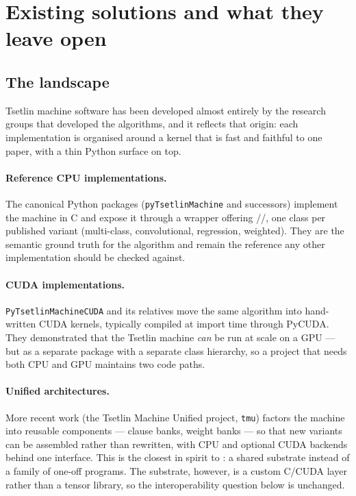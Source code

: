 \section{Existing solutions and what they leave open}
\label{sec:existing}

\subsection{The landscape}

Tsetlin machine software has been developed almost entirely by the research groups that
developed the algorithms, and it reflects that origin: each implementation is organised
around a kernel that is fast and faithful to one paper, with a thin Python surface on top.

\paragraph{Reference CPU implementations.}
The canonical Python packages (\texttt{pyTsetlinMachine} and successors) implement the
machine in C and expose it through a wrapper offering
\slash{}\slash{}, one class per published variant
(multi-class, convolutional, regression, weighted). They are the semantic ground truth for
the algorithm and remain the reference any other implementation should be checked against.

\paragraph{CUDA implementations.}
\texttt{PyTsetlinMachineCUDA} and its relatives move the same algorithm into hand-written
CUDA kernels, typically compiled at import time through PyCUDA. They demonstrated that the
Tsetlin machine \emph{can} be run at scale on a GPU --- but as a separate package with a
separate class hierarchy, so a project that needs both CPU and GPU maintains two code paths.

\paragraph{Unified architectures.}
More recent work (the Tsetlin Machine Unified project, \texttt{tmu}) factors the machine into
reusable components --- clause banks, weight banks --- so that new variants can be assembled
rather than rewritten, with CPU and optional CUDA backends behind one interface. This is the
closest in spirit to \ttlibname: a shared substrate instead of a family of one-off programs.
The substrate, however, is a custom C\slash CUDA layer rather than a tensor library, so the
interoperability question below is unchanged.

